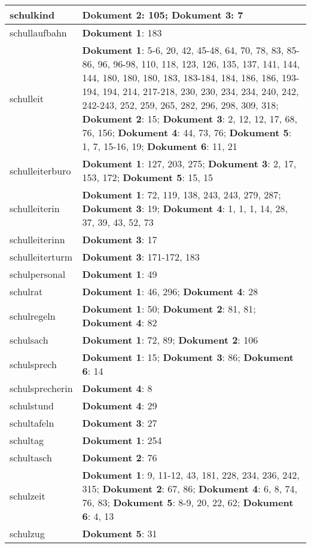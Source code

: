 \documentclass[a5paper]{article}
\begin{document}
\begin{longtable}[l]{|l|p{3in}|}
\hline
schulkind & \textbf{Dokument 2}: 105; \textbf{Dokument 3}: 7 \\
\hline
schullaufbahn & \textbf{Dokument 1}: 183 \\
\hline
schulleit & \textbf{Dokument 1}: 5-6, 20, 42, 45-48, 64, 70, 78, 83, 85-86, 96, 96-98, 110, 118, 123, 126, 135, 137, 141, 144, 144, 180, 180, 180, 183, 183-184, 184, 186, 186, 193-194, 194, 214, 217-218, 230, 230, 234, 234, 240, 242, 242-243, 252, 259, 265, 282, 296, 298, 309, 318; \textbf{Dokument 2}: 15; \textbf{Dokument 3}: 2, 12, 12, 17, 68, 76, 156; \textbf{Dokument 4}: 44, 73, 76; \textbf{Dokument 5}: 1, 7, 15-16, 19; \textbf{Dokument 6}: 11, 21 \\
\hline
schulleiterburo & \textbf{Dokument 1}: 127, 203, 275; \textbf{Dokument 3}: 2, 17, 153, 172; \textbf{Dokument 5}: 15, 15 \\
\hline
schulleiterin & \textbf{Dokument 1}: 72, 119, 138, 243, 243, 279, 287; \textbf{Dokument 3}: 19; \textbf{Dokument 4}: 1, 1, 1, 14, 28, 37, 39, 43, 52, 73 \\
\hline
schulleiterinn & \textbf{Dokument 3}: 17 \\
\hline
schulleiterturm & \textbf{Dokument 3}: 171-172, 183 \\
\hline
schulpersonal & \textbf{Dokument 1}: 49 \\
\hline
schulrat & \textbf{Dokument 1}: 46, 296; \textbf{Dokument 4}: 28 \\
\hline
schulregeln & \textbf{Dokument 1}: 50; \textbf{Dokument 2}: 81, 81; \textbf{Dokument 4}: 82 \\
\hline
schulsach & \textbf{Dokument 1}: 72, 89; \textbf{Dokument 2}: 106 \\
\hline
schulsprech & \textbf{Dokument 1}: 15; \textbf{Dokument 3}: 86; \textbf{Dokument 6}: 14 \\
\hline
schulsprecherin & \textbf{Dokument 4}: 8 \\
\hline
schulstund & \textbf{Dokument 4}: 29 \\
\hline
schultafeln & \textbf{Dokument 3}: 27 \\
\hline
schultag & \textbf{Dokument 1}: 254 \\
\hline
schultasch & \textbf{Dokument 2}: 76 \\
\hline
schulzeit & \textbf{Dokument 1}: 9, 11-12, 43, 181, 228, 234, 236, 242, 315; \textbf{Dokument 2}: 67, 86; \textbf{Dokument 4}: 6, 8, 74, 76, 83; \textbf{Dokument 5}: 8-9, 20, 22, 62; \textbf{Dokument 6}: 4, 13 \\
\hline
schulzug & \textbf{Dokument 5}: 31 \\

\end{longtable}
\end{document}
